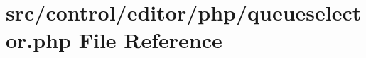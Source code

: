 \hypertarget{queueselector_8php}{}\section{src/control/editor/php/queueselector.php File Reference}
\label{queueselector_8php}
